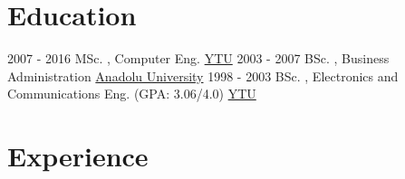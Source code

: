 \documentclass[letterpaper]{onur_class_file} %
\begin{document}
\makeprofile %

\section{Education}

\begin{twenty} %
	\twentyitem
    	{2007 - 2016}
        {}
        {\hspace{0.2cm}MSc. , Computer Eng. }
        {\href{http://www.yildiz.edu.tr}{\hspace{0.27cm}YTU}}
        {}
        {}
    \twentyitem
    {2003 - 2007}
    {}
    {\hspace{0.2cm}BSc. , Business Administration }
    {\href{https://www.anadolu.edu.tr/}{\hspace{0.27cm}Anadolu University}}
    {}
    {} 
   	\twentyitem
	    {1998 - 2003}
	    {}
	    {\hspace{0.2cm}BSc. , Electronics and Communications Eng. \textnormal{(GPA: 3.06/4.0)}}
	    {\href{http://www.yildiz.edu.tr/}{\hspace{0.27cm}YTU}}
	    {}
	    {} 
\end{twenty}


\section{Experience}
\end{document}
